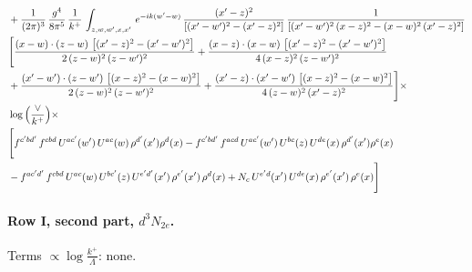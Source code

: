 \documentclass[10pt]{article}
\numberwithin{equation}{section}
\begin{document}
\begin{align}
& +\frac{1}{(2\pi)^{3}}\, \frac{g^{4}}{8\pi^{5}}\,\frac{1}{k^{+}}\,\int_{z,w,w^{\prime},x,x'}\, e^{-ik(w^{\prime}-w)}\,\frac{(x'-z)^{2}}{\left[(x'-w')^{2}-(x'-z)^{2}\right]}\,\frac{1}{\left[(x'-w')^{2}\,(x-z)^{2} - (x-w)^{2}\,(x'-z)^{2}\right]}\notag \\ & \Bigg[\frac{(x-w)\cdot (z-w)\, \left[(x'-z)^{2}-(x'-w')^{2}\right]}{2\, (z-w)^{2}\, (z-w')^{2}}  + \frac{(x-z)\cdot (x-w)\,\left[(x'-z)^{2}-(x'-w')^{2}\right] }{4\,(x-z)^{2}\,(z-w')^{2}}\notag \\ & +\frac{(x'-w')\cdot (z-w')\, \left[(x-z)^{2}-(x-w)^{2}\right]}{2\, (z-w)^{2}\, (z-w')^{2}}+ \frac{(x'-z)\cdot (x'-w')\, \left[(x-z)^{2}-(x-w)^{2}\right]}{4\, (z-w)^{2}\,(x'-z)^{2}}\Bigg]\times\,\notag \\ & \log{\left(\frac{\vee}{k^{+}}\right)} \times\notag \\ & \Bigg[f^{c'bd'}\,f^{cbd}\, U^{ac'}(w')\,U^{ac}(w)\,\rho^{d'}(x')\rho^{d}(x)- f^{c'bd'}\,f^{acd}\,U^{ac'}(w')\,U^{bc}(z)\,U^{de}(x)\,\rho^{d'}(x')\rho^{e}(x) \notag \\ & -f^{ac'd'}\,f^{cbd}\,U^{ac}(w)\,U^{bc'}(z)\,U^{e'd'}(x')\,\rho^{e'}(x')\,\rho^{d}(x) +N_{c}\,U^{e'd}(x')\,U^{de}(x)\,\rho^{e'}(x')\,\rho^{e}(x)\Bigg] \label{eq:B:G2I2d}
\end{align}

\paragraph{Row I, second part, $d^3N_{2e}$.}
\noindent Terms $\propto\log\frac{k^+}{\Lambda}$: none.
\end{document}
